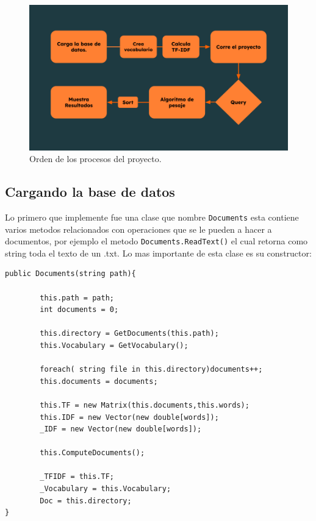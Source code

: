 \documentclass[10pt,a4paper]{report}
\begin{document}
\begin{figure}[h]
    \includegraphics[width = 1\linewidth]{Project.png}
    \caption{Orden de los procesos del proyecto.}
\end{figure}

\subsection{Cargando la base de datos}

\begin{flushleft}

    Lo primero que implemente fue una clase que nombre \texttt{Documents} esta contiene varios metodos relacionados con operaciones que se le pueden a hacer a documentos, por ejemplo el metodo \texttt{Documents.ReadText()} el cual retorna como string toda el texto de un .txt. Lo mas importante de esta clase es su constructor:

\end{flushleft}

\begin{verbatim}
public Documents(string path){

        this.path = path;
        int documents = 0;
        
        this.directory = GetDocuments(this.path);
        this.Vocabulary = GetVocabulary();
        
        foreach( string file in this.directory)documents++;
        this.documents = documents;
        
        this.TF = new Matrix(this.documents,this.words);
        this.IDF = new Vector(new double[words]);
        _IDF = new Vector(new double[words]);

        this.ComputeDocuments();

        _TFIDF = this.TF;
        _Vocabulary = this.Vocabulary;
        Doc = this.directory;
}
\end{verbatim}
\end{document}
